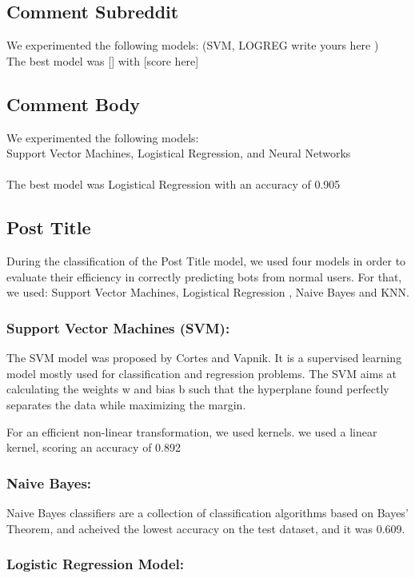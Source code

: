 \documentclass{article}
\begin{document}
    \subsection{Comment Subreddit}
        We experimented the following models: (SVM, LOGREG write yours here )\\
        The best model was [] with [score here]
    \subsection{Comment Body}
        We experimented the following models: \\ Support Vector Machines, Logistical Regression, and Neural Networks \\
\\
        The best model was Logistical Regression with an accuracy of 0.905
        
    \subsection{Post Title}      
    During the classification of  the Post Title model, we used four models in order to evaluate their efficiency in correctly predicting bots from normal users. For that, we used:         Support Vector Machines, Logistical Regression , Naive Bayes and KNN.
    
    \subsubsection{Support Vector Machines (SVM):}
    
    The SVM model was proposed by Cortes and Vapnik. It is a supervised learning model mostly used for classification and regression problems. The SVM aims at calculating the weights w and bias b such that the hyperplane found perfectly separates the data while maximizing the margin.
    
    For an efficient non-linear transformation, we used kernels.
we used a linear kernel, scoring an accuracy of 0.892       

    \subsubsection{Naive Bayes:}
    Naive Bayes classifiers are a collection of classification algorithms based on Bayes’ Theorem, and acheived the lowest accuracy on the test dataset, and it was 0.609.
    
    \subsubsection{Logistic Regression Model:}
    
\end{document}

